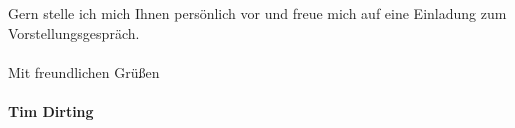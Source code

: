 \documentclass[12pt,twoside,a4paper]{scrlttr2}
\begin{document}
\begin{letter}
\begin{flushleft}
			\,\\
			\,\\
			Gern stelle ich mich Ihnen persönlich vor und freue mich auf eine Einladung zum Vorstellungsgespräch.\\
			\, \\
			Mit freundlichen Grüßen\\
			
			\textbf{\\Tim Dirting}		
	
			\end{flushleft}
			
		
		\begin{onehalfspace}
		
			
		\end{onehalfspace}
		
		
	\end{letter}
	
\end{document}
